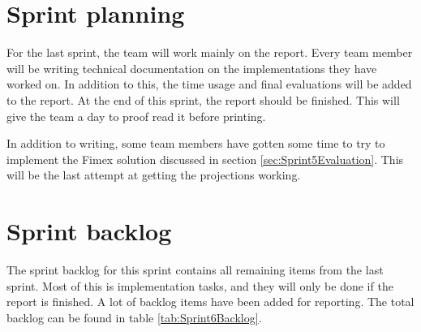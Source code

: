 \documentclass[11pt,a4paper,titlepage,oneside]{report}
\begin{document}
\section{Sprint planning}
For the last sprint, the team will work mainly on the report. Every team member will be writing technical documentation on the implementations they have worked on. In addition to this, the time usage and final evaluations will be added to the report. At the end of this sprint, the report should be finished. This will give the team a day to proof read it before printing. 

In addition to writing, some team members have gotten some time to try to implement the \gls{Fimex} solution discussed in section \ref{sec:Sprint5Evaluation}. This will be the last attempt at getting the projections working. 

\section{Sprint backlog}
\label{sec:Sprint6Backlog}
The sprint backlog for this sprint contains all remaining items from the last sprint. Most of this is implementation tasks, and they will only be done if the report is finished. A lot of backlog items have been added for reporting. The total backlog can be found in table \ref{tab:Sprint6Backlog}.
\end{document}
